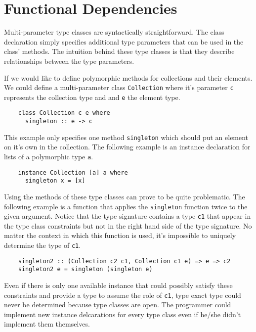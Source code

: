 \section{Functional Dependencies}
Multi-parameter type classes are syntactically straightforward. The class
declaration simply specifies additional type parameters that can be used
in the class' methods. The intuition behind these type classes is that they
describe relationships between the type parameters.

If we would like to define polymorphic methods for collections and their
elements. We could define a multi-parameter class \texttt{Collection} where it's
parameter \texttt{c} represents the collection type and and \texttt{e} the
element type.
\begin{verbatim}
    class Collection c e where
      singleton :: e -> c
\end{verbatim}
This example only specifies one method \texttt{singleton} which
should put an element on it's own in the collection.
The following example is an instance declaration for lists of a polymorphic type
\texttt{a}.
\begin{verbatim}
    instance Collection [a] a where
      singleton x = [x]
\end{verbatim}

Using the methods of these type classes can prove to be quite problematic. The
following example is a function that applies the \texttt{singleton} function
twice to the given argument. Notice that the type signature contains a type
\texttt{c1} that appear in the type class constraints but not in the right hand
side of the type signature. No matter the context in which this function is
used, it's impossible to uniquely determine the type of \texttt{c1}.

\begin{verbatim}
    singleton2 :: (Collection c2 c1, Collection c1 e) => e => c2
    singleton2 e = singleton (singleton e)
\end{verbatim}

Even if there is only one available instance that could possibly satisfy these
constraints and provide a type to assume the role of \texttt{c1}, type exact
type could never be determined because type classes are open. The programmer
could implement new instance delcarations for every type class even if he/she
didn't implement them themselves.

